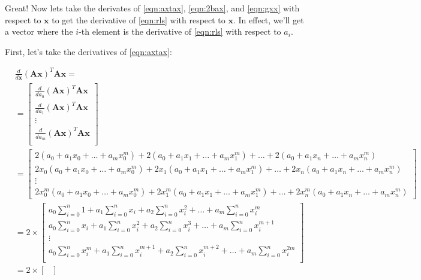 \documentclass{article}
\newcommand{\x}{\mathbf{x}}
\newcommand{\A}{\mathbf{A}}
\begin{document}
Great! Now lets take the derivates of \ref{eqn:axtax}, \ref{eqn:2bax}, and \ref{eqn:gxx} with respect to $\x$ to get the derivative of \ref{eqn:rls} with respect to $\x$. In effect, we'll get a vector where the $i$-th element is the derivative of \ref{eqn:rls} with respect to $a_i$.

First, let's take the derivatives of \ref{eqn:axtax}:

\begin{equation}
\begin{split}
    & \frac{d}{d\x} (\A\x)^T \A\x = \\
    & =
    \begin{bmatrix}
        \frac{d}{d a_0} (\A\x)^T \A\x \\
        \frac{d}{d a_1} (\A\x)^T \A\x \\
        \vdots \\
        \frac{d}{d a_m} (\A\x)^T \A\x \\
    \end{bmatrix}\\
    & =
    \begin{bmatrix}
        2(a_0 + a_1 x_0 + \dots + a_m x_0 ^ m) + 2(a_0 + a_1 x_1 + \dots + a_m x_1 ^ m) + \ldots + 2(a_0 + a_1 x_n + \dots + a_m x_n ^ m)\\
        2 x_0(a_0 + a_1 x_0 + \dots + a_m x_0 ^ m) + 2 x_1(a_0 + a_1 x_1 + \dots + a_m x_1 ^ m) + \ldots + 2 x_n(a_0 + a_1 x_n + \dots + a_m x_n ^ m)\\
        \vdots \\
        2 x_0^m(a_0 + a_1 x_0 + \dots + a_m x_0 ^ m) + 2 x_1^m(a_0 + a_1 x_1 + \dots + a_m x_1 ^ m) + \ldots + 2 x_n^m(a_0 + a_1 x_n + \dots + a_m x_n ^ m)
    \end{bmatrix}\\
    & = 2 \times
    \begin{bmatrix}
        a_0 \sum_{i=0}^{n} 1 + a_1 \sum_{i=0}^{n} x_i + a_2 \sum_{i=0}^{n} x_i^2 + \ldots + a_m \sum_{i=0}^{n} x_i ^ m\\
        a_0 \sum_{i=0}^{n} x_i + a_1 \sum_{i=0}^{n} x_i^2 + a_2 \sum_{i=0}^{n} x_i^3 + \ldots + a_m \sum_{i=0}^{n} x_i ^ {m+1}\\
        \vdots \\
        a_0 \sum_{i=0}^{n} x_i^m + a_1 \sum_{i=0}^{n} x_i^{m+1} + a_2 \sum_{i=0}^{n} x_i^{m+2} + \ldots + a_m \sum_{i=0}^{n} x_i ^ {2m}\\
    \end{bmatrix}\\
    & = 2 \times
    \begin{bmatrix}

\end{bmatrix}
\end{split}
\end{equation}
\end{document}
